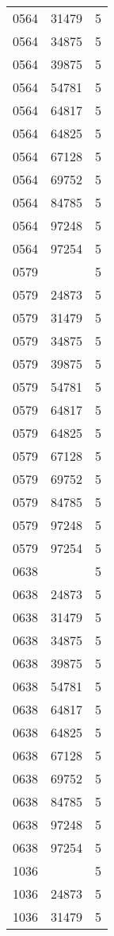 {{\begin{tabular}{|c|c||c|}
0564&31479&5\\ 0564&34875&5\\ 0564&39875&5\\ 0564&54781&5\\ 0564&64817&5\\ 0564&64825&5\\ 0564&67128&5\\ 0564&69752&5\\ 0564&84785&5\\ 0564&97248&5\\ 0564&97254&5\\ 0579& &5\\ 0579&24873&5\\ 0579&31479&5\\ 0579&34875&5\\ 0579&39875&5\\ 0579&54781&5\\ 0579&64817&5\\ 0579&64825&5\\ 0579&67128&5\\ 0579&69752&5\\ 0579&84785&5\\ 0579&97248&5\\ 0579&97254&5\\ 0638& &5\\ 0638&24873&5\\ 0638&31479&5\\ 0638&34875&5\\ 0638&39875&5\\ 0638&54781&5\\ 0638&64817&5\\ 0638&64825&5\\ 0638&67128&5\\ 0638&69752&5\\ 0638&84785&5\\ 0638&97248&5\\ 0638&97254&5\\ 1036& &5\\ 1036&24873&5\\ 1036&31479&5\\ 
        \hline
        \end{tabular}
    }
}


